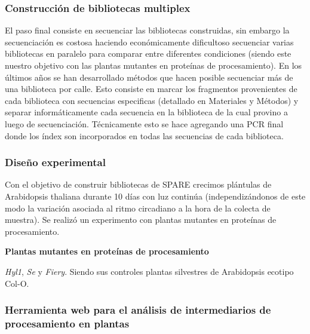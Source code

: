 \subsubsection{Construcción de bibliotecas multiplex}
El paso final consiste en secuenciar las bibliotecas construidas, sin embargo la secuenciación es costosa haciendo económicamente dificultoso secuenciar varias bibliotecas en paralelo para comparar entre diferentes condiciones (siendo este nuestro objetivo con las plantas mutantes en proteínas de procesamiento).
En los últimos años se han desarrollado métodos que hacen posible secuenciar más de una biblioteca por calle.
Esto consiste en marcar los fragmentos provenientes de cada biblioteca con secuencias especificas (detallado en Materiales y Métodos) y separar informáticamente cada secuencia en la biblioteca de la cual provino a luego de secuenciación.
Técnicamente esto se hace agregando una PCR final donde los índex son incorporados en todas las secuencias de cada biblioteca.

\subsubsection{Diseño experimental}

Con el objetivo de construir bibliotecas de SPARE crecimos plántulas de Arabidopsis thaliana durante 10 días con luz continúa (independizándonos de este modo la variación asociada al ritmo circadiano a la hora de la colecta de muestra).
Se realizó un experimento con plantas mutantes en proteínas de procesamiento.

\textbf{Plantas mutantes en proteínas de procesamiento}

\textit{Hyl1}, \textit{Se} y \textit{Fiery}.
Siendo sus controles plantas silvestres de Arabidopsis ecotipo Col-O.

 

\subsubsection{Herramienta web para el análisis de intermediarios de procesamiento en plantas}

